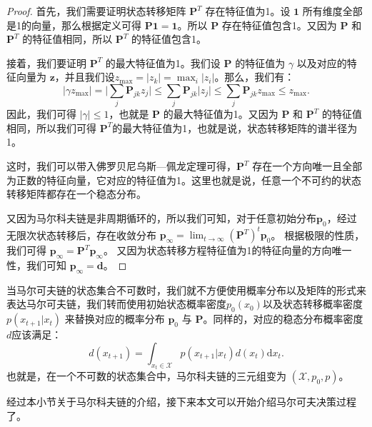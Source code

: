 \begin{proof}
    首先，我们需要证明状态转移矩阵 $\mathbf{P}^T$ 存在特征值为1。设 $\mathbf{1}$ 所有维度全部是1的向量，那么根据定义可得 $\mathbf{P} \mathbf{1} = \mathbf{1}$。所以 $\mathbf{P}$ 存在特征值包含1。又因为 $\mathbf{P}$ 和 $\mathbf{P}^T$ 的特征值相同，所以 $\mathbf{P}^T$ 的特征值包含1。

    接着，我们要证明 $\mathbf{P}^T$ 的最大特征值为1。我们设 $\mathbf{P}$ 的特征值为 $\gamma$ 以及对应的特征向量为 $\mathbf{z}$，并且我们设$z_{\max} = \vert z_k \vert = \max_i \vert z_i \vert$。那么，我们有：
    \begin{equation}
        \vert \gamma z_{\max} \vert 
        = \bigg\vert \sum_j \mathbf{P}_{jk} z_j \bigg\vert
        \le \sum_j \mathbf{P}_{jk} \vert z_j \vert
        \le \sum_j \mathbf{P}_{jk} z_{\max} \le z_{\max}.
    \end{equation}
    因此，我们可得 $\vert \gamma \vert \le 1$，也就是 $\mathbf{P}$ 的最大特征值为1。又因为 $\mathbf{P}$ 和 $\mathbf{P}^T$ 的特征值相同，所以我们可得 $\mathbf{P}^T$的最大特征值为1，也就是说，状态转移矩阵的谱半径为1。
    
    这时，我们可以带入佛罗贝尼乌斯—佩龙定理可得，$\mathbf{P}^T$ 存在一个方向唯一且全部为正数的特征向量，它对应的特征值为1。这里也就是说，任意一个不可约的状态转移矩阵都存在一个稳态分布。

    又因为马尔科夫链是非周期循环的，所以我们可知，对于任意初始分布$\mathbf{p}_0$，经过无限次状态转移后，存在收敛分布
    $\mathbf{p}_{\infty} = \lim_{t \rightarrow \infty} (\mathbf{P}^T)^t \mathbf{p}_0$。
    根据极限的性质，我们可得 
    $\mathbf{p}_{\infty} = \mathbf{P}^T \mathbf{p}_{\infty}$。
    又因为状态转移方程特征值为1的特征向量的方向唯一性，我们可知 
    $\mathbf{p}_{\infty} = \mathbf{d}$。
\end{proof}

\begin{remark}
当马尔可夫链的状态集合不可数时，我们就不方便使用概率分布以及矩阵的形式来表达马尔可夫链，我们转而使用初始状态概率密度$p_0(x_0)$以及状态转移概率密度$p(x_{t+1} \vert x_t)$ 来替换对应的概率分布 $\mathbf{p}_0$ 与 $\mathbf{P}$。同样的，对应的稳态分布概率密度$d$应该满足：
\begin{equation}
    d(x_{t+1}) = \int_{x_t \in \mathcal{X}} p(x_{t+1} \vert x_t) d(x_t) \mathrm{d} x_t.
\end{equation}
也就是，在一个不可数的状态集合中，马尔科夫链的三元组变为 $(\mathcal{X}, p_0, p)$。
\end{remark}

经过本小节关于马尔科夫链的介绍，接下来本文可以开始介绍马尔可夫决策过程了。

